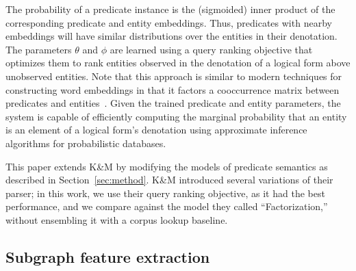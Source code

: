 \documentclass[11pt]{article}
\newcommand{\secref}[1]{Section~\ref{sec:#1}}
\begin{document}
The probability of a predicate instance is the (sigmoided) inner
product of the corresponding predicate and entity embeddings. Thus,
predicates with nearby embeddings will have similar distributions over
the entities in their denotation. The parameters $\theta$ and $\phi$
are learned using a query ranking objective that optimizes them to
rank entities observed in the denotation of a logical form above
unobserved entities. Note that this approach is similar to modern
techniques for constructing word embeddings in that it factors a
cooccurrence matrix between predicates and
entities~\cite{levy-2014-w2v-as-mf}. Given the trained predicate and
entity parameters, the system is capable of efficiently computing the
marginal probability that an entity is an element of a logical form's
denotation using approximate inference algorithms for probabilistic
databases.

This paper extends K\&M by modifying the models of predicate semantics
as described in \secref{method}. K\&M introduced several variations of
their parser; in this work, we use their query ranking objective, as
it had the best performance, and we compare against the model they
called ``Factorization,'' without ensembling it with a corpus lookup
baseline.

\subsection{Subgraph feature extraction}
\end{document}

